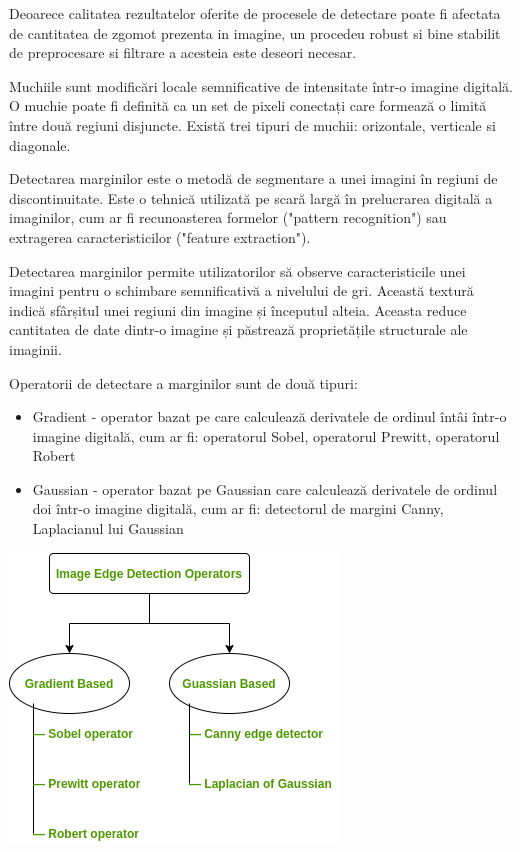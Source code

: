 \documentclass[10pt]{article}
\begin{document}
\> Deoarece calitatea rezultatelor oferite de procesele de detectare poate fi afectata de cantitatea de zgomot prezenta in imagine,
un procedeu robust si bine stabilit de preprocesare si filtrare a acesteia este deseori necesar. 

\> Muchiile sunt modificări locale semnificative de intensitate într-o imagine digitală.
O muchie poate fi definită ca un set de pixeli conectați care formează o limită între două regiuni disjuncte.
Există trei tipuri de muchii: orizontale, verticale si diagonale.

\> Detectarea marginilor este o metodă de segmentare a unei imagini în regiuni de discontinuitate.
Este o tehnică utilizată pe scară largă în prelucrarea digitală a imaginilor, cum ar fi recunoasterea formelor ("pattern recognition") sau
extragerea caracteristicilor ("feature extraction").

\> Detectarea marginilor permite utilizatorilor să observe caracteristicile unei imagini pentru o schimbare semnificativă a nivelului de gri.
Această textură indică sfârșitul unei regiuni din imagine și începutul alteia.
Aceasta reduce cantitatea de date dintr-o imagine și păstrează proprietățile structurale ale imaginii. 

Operatorii de detectare a marginilor sunt de două tipuri: 

\begin{itemize}

  \item Gradient - operator bazat pe care calculează derivatele de ordinul întâi într-o imagine digitală,
  cum ar fi: operatorul Sobel, operatorul Prewitt, operatorul Robert
  \item Gaussian - operator bazat pe Gaussian care calculează derivatele de ordinul doi într-o imagine digitală,
  cum ar fi: detectorul de margini Canny, Laplacianul lui Gaussian

\end{itemize}

\begin{center}

  \includegraphics[scale=0.5]{operatori-detectare}
  
\end{center}
\end{document}
